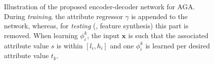 \documentclass[10pt,twocolumn,letterpaper]{article}
\begin{document}
\begin{figure}[t!]
\caption{Illustration of the proposed encoder-decoder network for AGA.
During \emph{training}, the attribute regressor $\gamma$ is appended to
the network, whereas, for \emph{testing} (\ie, feature synthesis) 
this part is removed. When learning $\phi_i^k$, the input $\mathbf{x}$ 
is such that the associated attribute value $s$ is within $[l_i,h_i]$ 
and one $\phi_i^k$ is learned per desired attribute value $t_k$.
\label{fig:EDN}}
\end{figure}
\end{document}
